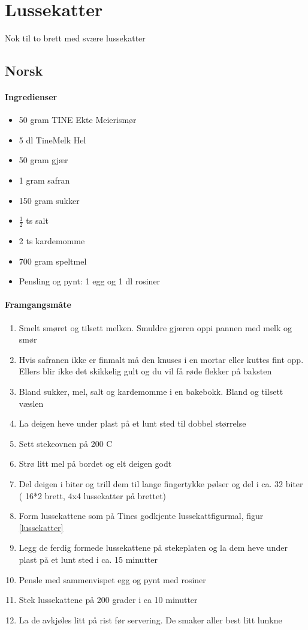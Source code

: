 \section{﻿Lussekatter}
Nok til to brett med svære lussekatter
\subsection{Norsk}

\paragraph{Ingredienser}
\begin{itemize}[noitemsep]
	\item 50 gram TINE Ekte Meierismør
	\item 5 dl TineMelk Hel
	\item 50 gram gjær
	\item 1 gram safran
	\item 150 gram sukker
	\item $\frac{1}{2}$ ts salt
	\item 2 ts kardemomme
	\item 700 gram speltmel
	\item Pensling og pynt: 1 egg og 1 dl rosiner
\end{itemize}

\paragraph{Framgangsmåte}
\begin{enumerate}[noitemsep]
	\item Smelt smøret og tilsett melken. Smuldre gjæren oppi pannen med melk og smør
	\item Hvis safranen ikke er finmalt må den knuses i en mortar eller kuttes fint opp. Ellers blir ikke det skikkelig gult og du vil få røde flekker på baksten
	\item Bland sukker, mel, salt og kardemomme i en bakebokk. Bland og tilsett væslen
	\item La deigen heve under plast på et lunt sted til dobbel størrelse
	\item Sett stekeovnen på 200 \degree C
	\item Strø litt mel på bordet og elt deigen godt
	\item Del deigen i biter og trill dem til lange fingertykke pølser og del i ca. 32 biter ( 16*2 brett, 4x4 lussekatter på brettet)
	\item Form lussekattene som på Tines godkjente lussekattfigurmal, figur  \ref{lussekatter}
	\item Legg de ferdig formede lussekattene på stekeplaten og la dem heve under plast på et lunt sted i ca. 15 minutter
	\item Pensle med sammenvispet egg og pynt med rosiner
	\item Stek lussekattene på 200 grader i  ca 10 minutter
	\item La de avkjøles litt på rist før servering. De smaker aller best litt lunkne
\end{enumerate}


